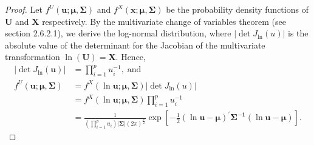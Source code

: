 \documentclass[11pt,letterpaper]{article}
\numberwithin{equation}{section}
\numberwithin{equation}{section}
\numberwithin{equation}{section}
\begin{document}
\begin{proof}
Let $f^U(\bm{u}; \bm{\mu},\bm{\Sigma})$ and $f^X(\bm{x}; \bm{\mu},\bm{\Sigma})$ be the probability density functions of $\bm{U}$ and $\bm{X}$ respectively. By the multivariate change of variables theorem (see \cite{murphy2012machine} section 2.6.2.1), we derive the log-normal distribution, where $ | \det J_{\ln} (u) | $ is the absolute value of the determinant for the Jacobian of the multivariate transformation $\ln(\bm{U}) = \bm{X} $. Hence,
\begin{align*}
 | \det J_{\ln} (\bm{u}) | & = \prod_{i=1}^p u_i^{-1}, \; \text{and} \; \\
   f^U(\bm{u}; \bm{\mu},\bm{\Sigma})  & =  f^X(\ln \bm{u}; \bm{\mu},\bm{\Sigma})  | \det J_{\ln} (u) | \\
  & = f^X(\ln \bm{u}; \bm{\mu},\bm{\Sigma})\prod_{i=1}^p u_i^{-1} \\
  & =  \frac{1}{(\prod_{i=1}^{p}u_{i})| \bm{\Sigma} |(2 \pi)^{\frac{p}{2}}}   \exp\left[-\frac{1}{2}(\ln \bm{u} -\bm{\mu})^{'}  \bm{\Sigma^{-1}}(\ln \bm{u} -\bm{\mu})\right].
  \end{align*}
\end{proof}
\end{document}
